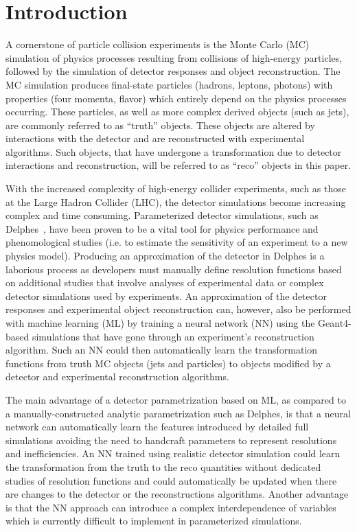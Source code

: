 \documentclass[showpacs,showkeys,preprint,prd,nofootinbib,linenumbers,12pt,superscriptaddress]{revtex4-1}
\begin{document}
\maketitle

\section{Introduction}
\label{sec:intro}
A cornerstone of particle collision experiments is the Monte Carlo (MC) simulation of physics processes resulting from collisions of high-energy particles, followed by the simulation of detector responses and object reconstruction. The MC simulation produces final-state particles (hadrons, leptons, photons) with properties (four momenta, flavor) which entirely depend on the physics processes occurring. These particles, as well as more complex derived objects (such as jets), are commonly referred to as ``truth'' objects. These objects are altered by interactions with the detector and are reconstructed with experimental algorithms. Such objects, that have undergone a transformation due to detector interactions and reconstruction, will be referred to as ``reco'' objects in this paper.

With the increased complexity of high-energy collider experiments, such as those at the Large Hadron Collider (LHC), the detector simulations become increasing complex and time consuming. Parameterized detector simulations, such as Delphes~\cite{deFavereau:2013fsa}, have been proven to be a vital tool for physics performance and phenomological studies (i.e. to estimate the sensitivity of an experiment to a new physics model). Producing an approximation of the detector in Delphes is a laborious process as developers must manually define resolution functions based on additional studies that involve analyses of experimental data or complex detector simulations used by experiments. An approximation of the detector responses and experimental object reconstruction can, however, also be performed with machine learning (ML) by training a neural network (NN) using the Geant4-based simulations that have gone through an experiment's reconstruction algorithm. Such an NN could then automatically learn the transformation functions from truth MC objects (jets and particles) to objects modified by a detector and experimental reconstruction algorithms. 

The main advantage of a detector parametrization based on ML, as compared to a manually-constructed analytic parametrization such as Delphes, is that a neural network can automatically learn the features introduced by detailed full simulations avoiding the need to handcraft parameters to represent resolutions and inefficiencies. An NN trained using realistic detector simulation could learn the transformation from the truth to the reco quantities without dedicated studies of resolution functions and could automatically be updated when there are changes to the detector or the reconstructions algorithms. Another advantage is that the NN approach can introduce a complex interdependence of variables which is currently difficult to implement in parameterized simulations.
\end{document}

